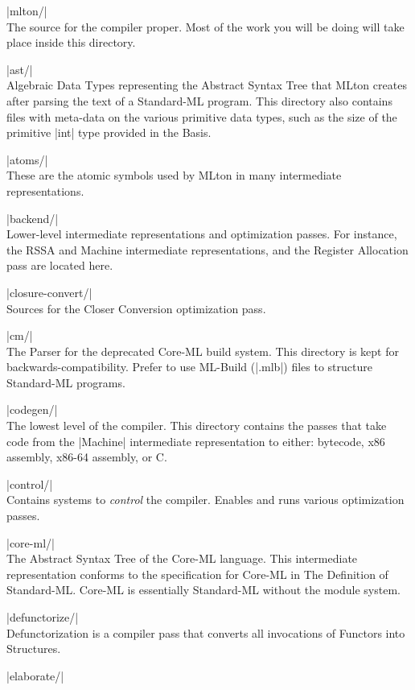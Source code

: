 \documentclass{article}
\begin{document}
\begin{description}
\item |mlton/| \\
  The source for the compiler proper. Most of the work you will be doing will take place inside this directory.
\begin{description}
\item |ast/| \\
  Algebraic Data Types representing the Abstract 
Syntax Tree that MLton creates after parsing the text of a Standard-ML program. This directory also contains files with meta-data on the various primitive data types, such as the size of the primitive |int| type provided in the Basis.
\item |atoms/| \\
  These are the atomic symbols used by MLton in many intermediate representations. 
\item |backend/| \\
  Lower-level intermediate representations and optimization passes. For instance, the RSSA and Machine intermediate representations, and the Register Allocation pass are located here.
\item |closure-convert/| \\
  Sources for the Closer Conversion optimization pass.
\item |cm/| \\
  The Parser for the deprecated Core-ML build system. This directory is kept for backwards-compatibility. Prefer to use ML-Build (|.mlb|) files to structure Standard-ML programs.
\item |codegen/| \\
  The lowest level of the compiler. This directory contains the passes that take code from the |Machine| intermediate representation to either: bytecode, x86 assembly, x86-64 assembly, or C. 
\item |control/| \\
  Contains systems to \emph{control} the compiler. Enables and runs various optimization passes.
\item |core-ml/| \\
  The Abstract Syntax Tree of the Core-ML language. This intermediate representation conforms to the specification for Core-ML in The Definition of Standard-ML. Core-ML is essentially Standard-ML without the module system.
\item |defunctorize/| \\
  Defunctorization is a compiler pass that converts all invocations of Functors into Structures. 
\item |elaborate/| \\

\end{description}
\end{description}
\end{document}
